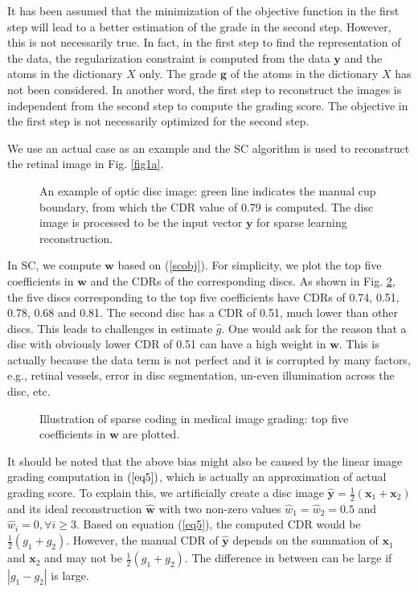 \documentclass[journal]{IEEEtran}
\begin{document}
 It has been assumed that the minimization of the objective function in the first step will lead to a better estimation of the grade in the second step. However, this is not necessarily  true.
         In fact, in the first step to find the representation of the data, the regularization constraint is computed from the data $\textbf{y}$ and the atoms in the dictionary $X$ only. The grade $\textbf{g}$ of the atoms in the dictionary $X$ has not been considered.  In another word,  the first step to reconstruct the images is independent from the second step to compute the grading score. The objective in the first step is not necessarily optimized for the second step.


    We use an actual  case  as an example and the SC \cite{sparsecoding} algorithm is used to reconstruct the retinal image in Fig. \ref{fig1a}.
     \begin{figure}
    	\caption{An example of optic disc image: green line indicates the manual cup boundary, from which the CDR value of 0.79 is computed. The disc image is processed to be the input vector $\textbf{y}$ for sparse learning reconstruction. } \label{fig1}
    \end{figure}
 In SC, we compute $\textbf{w}$ based on (\ref{scobj}).
 For simplicity, we plot the top five coefficients in $\textbf{w}$ and the CDRs of the corresponding discs. As shown in Fig. \ref{fig2}, the five discs corresponding to the top five coefficients have CDRs of 0.74, 0.51, 0.78, 0.68 and 0.81.
  The second disc has a CDR of 0.51, much lower than other discs.   This   leads to challenges in estimate $\hat{g}$.
  One would ask for the reason that a disc with obviously lower CDR of 0.51 can have a high weight in $\textbf{w}$. This is actually because the data term is not perfect and it is corrupted by many factors, e.g., retinal vessels, error in disc segmentation, un-even illumination across the disc, etc.
       \begin{figure}
     	\caption{Illustration of sparse coding in medical image grading: top five  coefficients in $\textbf{w}$ are plotted.  } \label{fig2}
     \end{figure}


     It should be noted that the above bias might also be caused by the linear image grading computation in $(\ref{eq5})$, which   is actually an approximation of actual grading score.
To explain this, we  artificially create a disc  image  $\hat{\textbf{y}}=\frac{1}{2}(\textbf{x}_1+\textbf{x}_2)$ and its ideal reconstruction  $\hat{\textbf{w}}$ with two non-zero values $\hat{w}_1=\hat{w}_2=0.5$ and   $\hat{w}_i =0, \forall i\geq 3$. Based on equation (\ref{eq5}), the computed CDR would be $\frac{1}{2}(g_1+g_2)$. However, the manual CDR of $\hat{\textbf{y}}$ depends on the summation of $\textbf{x}_1$ and $\textbf{x}_2$ and may not be $\frac{1}{2}(g_1+g_2)$.  The difference in between  can be large if  $|g_1-g_2|$ is large.
\end{document}
